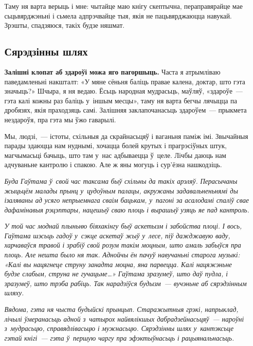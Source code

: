 
Таму ня варта верыць і мне: чытайце маю кнігу скептычна, пераправярайце мае сьцьвярджэньні і сьмела адпрэчвайце тыя, якія не пацьвярджаюцца навукай. Зрэшты, спадзяюся, такіх будзе няшмат.

\subsection*{Сярэдзінны шлях}

\textbf{Залішні клопат аб здароўі можа яго пагоршыць.} Часта я атрымліваю паведамленьні накшталт: «У мяне сёньня баліць правае калена, доктар, што гэта значыць?» Шчыра, я ня ведаю. Ёсьць народная мудрасьць, маўляў, «здароўе~--- гэта калі кожны раз баліць у~іншым месцы», таму ня варта бегчы лячыцца па дробязях, якія праходзяць самі. Залішняя заклапочанасьць здароўем~--- прыкмета нездароўя, пра гэта мы ўжо гаварылі.

Мы, людзі,~--- істоты, схільныя да скрайнасьцяў і ваганьня паміж імі. Звычайныя парады здаюцца нам нуднымі, хочацца болей крутых і прагрэсіўных штук, магчымасьці бачыць, што там у~нас адбываецца ў~целе. Лічбы даюць нам адчуваньне кантролю і спакою. Але ж яны могуць і сур'ёзна нашкодзіць.

\emph{Буда Гаўтама ў~свой час таксама быў схільны да такіх арэляў. Перасычаны жыцьцём малады прынц у~цудоўным палацы, акружаны задавальненьнямі ды ізаляваны ад усяго непрыемнага сваім бацькам, у~пагоні за асалодамі спаліў свае дафамінавыя рэцэптары, нацешыў сваю плоць і вырашыў узяць яе пад кантроль.}

\emph{У той час моднай плыньню біяхакінгу быў аскетызм і забойства плоці. І вось, Гаўтама шэсьць гадоў у~сэкце аскетаў жыў у~лесе, піў дажджавую ваду, харчаваўся травой і зрабіў свой розум такім моцным, што амаль забыўся пра плоць. Але нешта было ня так. Аднойчы ён пачуў навучаньні старога музыкі: «Калі вы нацягнеце струну занадта моцна, яна парвецца. Калі нацяжэньне будзе слабым, струна не гучацьме…» Гаўтама зразумеў, што даў пудла, і зразумеў, што трэба рабіць. Так нарадзіўся будызм~--- вучэньне аб сярэдзінным шляху.}

\emph{Вядома, гэта ня чыста будыйскі прынцып. Старажытныя грэкі, напрыклад, лічылі ўмеранасьць адной з~чатырох найвялікшых дабрадзейнасьцяў~--- нароўні з~мудрасьцю, справядлівасьцю і мужнасьцю. Сярэдзінны шлях у~кантэксьце гэтай кнігі~--- гэта ў~першую чаргу пра эфэктыўнасьць і рацыянальнасьць.}

